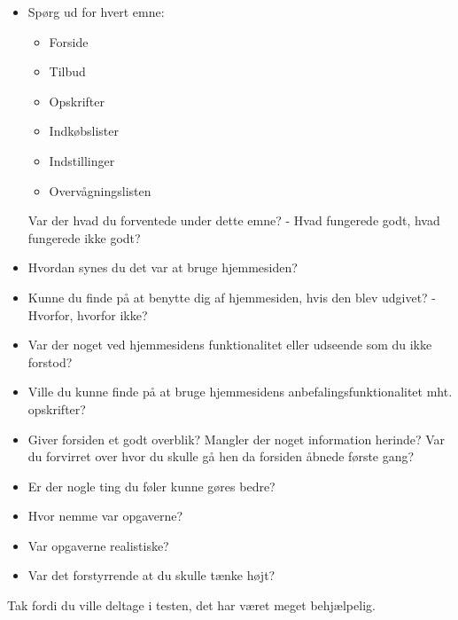 \begin{itemize}
	\item Spørg ud for hvert emne:
		\begin{itemize}
			\item Forside
			\item Tilbud
			\item Opskrifter
			\item Indkøbslister
			\item Indstillinger
			\item Overvågningslisten
		\end{itemize}
	Var der hvad du forventede under dette emne? - Hvad fungerede godt, hvad fungerede ikke godt?
	\item Hvordan synes du det var at bruge hjemmesiden?
	\item Kunne du finde på at benytte dig af hjemmesiden, hvis den blev udgivet? - Hvorfor, hvorfor ikke?
	\item Var der noget ved hjemmesidens funktionalitet eller udseende som du ikke forstod?
	\item Ville du kunne finde på at bruge hjemmesidens anbefalingsfunktionalitet mht. opskrifter?
	\item Giver forsiden et godt overblik? Mangler der noget information herinde? Var du forvirret over hvor du skulle gå hen da forsiden åbnede første gang?
	
	
	\item Er der nogle ting du føler kunne gøres bedre?
	\item Hvor nemme var opgaverne?
	\item Var opgaverne realistiske?
	\item Var det forstyrrende at du skulle tænke højt?
\end{itemize}	

Tak fordi du ville deltage i testen, det har været meget behjælpelig.

